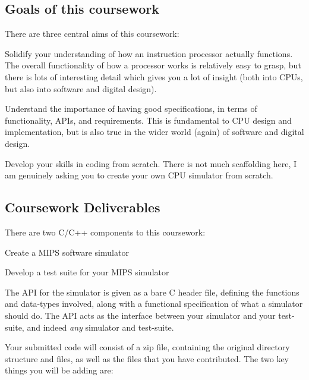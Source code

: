 \subsection*{Goals of this coursework }

There are three central aims of this coursework\+:


\begin{DoxyItemize}
\item Solidify your understanding of how an instruction processor actually functions. The overall functionality of how a processor works is relatively easy to grasp, but there is lots of interesting detail which gives you a lot of insight (both into C\+P\+Us, but also into software and digital design).
\item Understand the importance of having good specifications, in terms of functionality, A\+P\+Is, and requirements. This is fundamental to C\+P\+U design and implementation, but is also true in the wider world (again) of software and digital design.
\item Develop your skills in coding from scratch. There is not much scaffolding here, I am genuinely asking you to create your own C\+P\+U simulator from scratch.
\end{DoxyItemize}

\subsection*{Coursework Deliverables }

There are two C/\+C++ components to this coursework\+:


\begin{DoxyEnumerate}
\item Create a M\+I\+P\+S software simulator
\item Develop a test suite for your M\+I\+P\+S simulator
\end{DoxyEnumerate}

The A\+P\+I for the simulator is given as a bare C header file, defining the functions and data-\/types involved, along with a functional specification of what a simulator should do. The A\+P\+I acts as the interface between your simulator and your test-\/suite, and indeed {\itshape any} simulator and test-\/suite.

Your submitted code will consist of a zip file, containing the original directory structure and files, as well as the files that you have contributed. The two key things you will be adding are\+:


